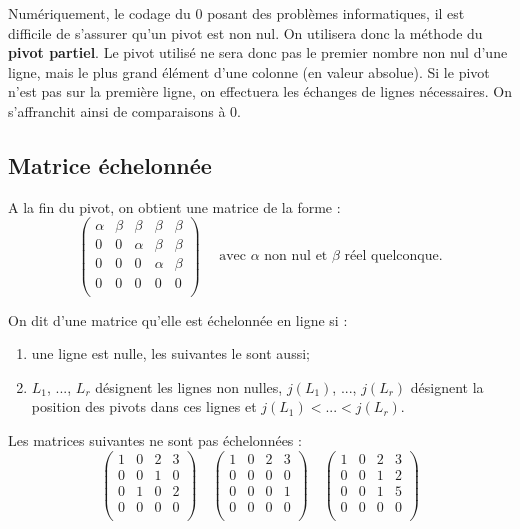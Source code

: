 \documentclass[10pt]{article}
\begin{document}
\begin{rem}
Numériquement, le codage du 0 posant des problèmes informatiques, il est difficile de s'assurer qu'un pivot est non nul. On utilisera donc la méthode du \textbf{pivot partiel}. Le pivot utilisé ne sera donc pas le premier nombre non nul d'une ligne, mais le plus grand élément d'une colonne (en valeur absolue). Si le pivot n'est pas sur la première ligne, on effectuera les échanges de lignes nécessaires. On s'affranchit ainsi de comparaisons à 0. 

\end{rem}
\subsection{Matrice échelonnée}
A la fin du pivot, on obtient une matrice de la forme :
$$
\begin{pmatrix}
\alpha &\beta & \beta & \beta & \beta \\
0 & 0 & \alpha & \beta  &  \beta \\
0 & 0 & 0 &  \alpha& \beta \\
0 & 0 & 0 & 0 &  0\\
\end{pmatrix}
\quad 
\text{ avec }\alpha \text{ non nul et }\beta \text{ réel quelconque.}
$$

\begin{defi}
On dit d'une matrice qu'elle est échelonnée en ligne si :
\begin{enumerate}
\item une ligne est nulle, les suivantes le sont aussi;
\item $L_1$, ..., $L_r$ désignent les lignes non nulles, $j(L_1)$, ..., $j(L_r)$ désignent la position des pivots dans ces lignes et $j(L_1)<...<j(L_r)$. 
\end{enumerate}
\end{defi}

\begin{exemple}
Les matrices suivantes ne sont pas échelonnées : 
$$
\begin{pmatrix}
1 & 0 & 2 & 3\\
0 & 0 & 1 & 0\\
0 & 1 & 0 & 2\\
0 & 0 & 0 & 0\\
\end{pmatrix}
\quad
\begin{pmatrix}
1 & 0 & 2 & 3\\
0 & 0 & 0 & 0\\
0 & 0 & 0 & 1\\
0 & 0 & 0 & 0\\
\end{pmatrix}
\quad
\begin{pmatrix}
1 & 0 & 2 & 3\\
0 & 0 & 1 & 2\\
0 & 0 & 1 & 5\\
0 & 0 & 0 & 0\\
\end{pmatrix}
$$
\end{exemple}
\end{document}

